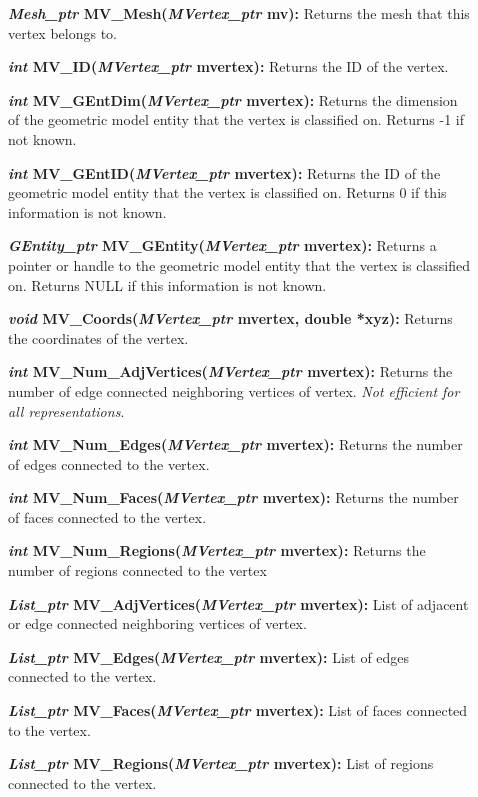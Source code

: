 \documentclass[12pt]{article}
\begin{document}
\begin{description}
\item[]\textbf{\textit{Mesh\_ptr} MV\_Mesh(\textit{MVertex\_ptr} mv):}
Returns the mesh that this vertex belongs to.

\item[]\textbf{\textit{int} MV\_ID(\textit{MVertex\_ptr} mvertex):} Returns
the ID of the vertex. 

\item[]\textbf{\textit{int} MV\_GEntDim(\textit{MVertex\_ptr} mvertex):}
Returns the dimension of the geometric model entity that the vertex is
classified on. Returns -1 if not known.

\item[]\textbf{\textit{int} MV\_GEntID(\textit{MVertex\_ptr} mvertex):}
Returns the ID of the geometric model entity that the vertex is
classified on. Returns 0 if this information is not known.

\item[]\textbf{\textit{GEntity\_ptr} MV\_GEntity(\textit{MVertex\_ptr}
  mvertex):} Returns a pointer or handle to the geometric model entity
  that the vertex is classified on. Returns NULL if this information
  is not known.

\item[]\textbf{\textit{void} MV\_Coords(\textit{MVertex\_ptr} mvertex,
double *xyz):} Returns the coordinates of the vertex.


\item[]\textbf{\textit{int} MV\_Num\_AdjVertices(\textit{MVertex\_ptr}
mvertex):} Returns the number of edge connected neighboring vertices of
vertex. \textit{Not efficient for all representations}.

\item[]\textbf{\textit{int} MV\_Num\_Edges(\textit{MVertex\_ptr} mvertex):}
Returns the number of edges connected to the vertex.

\item[]\textbf{\textit{int} MV\_Num\_Faces(\textit{MVertex\_ptr} mvertex):}
Returns the number of faces connected to the vertex.

\item[]\textbf{\textit{int} MV\_Num\_Regions(\textit{MVertex\_ptr} mvertex):}
Returns the number of regions connected to the vertex

\item[]\textbf{\textit{List\_ptr} MV\_AdjVertices(\textit{MVertex\_ptr}
mvertex):} List of adjacent or edge connected neighboring vertices of vertex.

\item[]\textbf{\textit{List\_ptr} MV\_Edges(\textit{MVertex\_ptr} mvertex):}
List of edges connected to the vertex.

\item[]\textbf{\textit{List\_ptr} MV\_Faces(\textit{MVertex\_ptr} mvertex):}
List of faces connected to the vertex.

\item[]\textbf{\textit{List\_ptr} MV\_Regions(\textit{MVertex\_ptr} mvertex):}
List of regions connected to the vertex.
\end{description}
\end{document}
